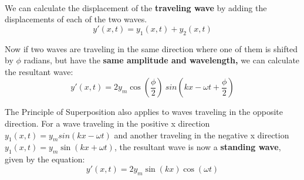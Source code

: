 \documentclass[11pt]{article}
\begin{document}
\hfill
\begin{minipage}[b]{0.3\textwidth}
\end{minipage}

    \noindent \\ We can calculate the displacement of the \textbf{traveling wave} by adding the displacements of each of the two waves.
    \begin{equation}
        y'(x,t) = y_1(x,t) + y_2(x,t) \tag{displacement of waves}
        \end{equation}

    \noindent Now if two waves are traveling in the same direction where one of them is shifted by $\phi$ radians,
    but have the \textbf{same amplitude and wavelength,} we can calculate the resultant wave:
    \begin{equation}
        y'(x,t) = 2y_{m}\cos(\frac{\phi}{2})\    sin(kx - \omega t + \frac{\phi}{2}) \tag{traveling wave}
    \end{equation}

    \noindent The Principle of Superposition also applies to waves traveling in the opposite direction.
    For a wave traveling in the positive x direction $y_1(x,t) = y_msin(kx - \omega t)$ and another traveling
    in the negative x direction $y_1(x,t) = y_m\sin(kx + \omega t)$, the resultant wave is now a
    \textbf{standing wave}, given by the equation:
    \begin{equation}
        y'(x,t) = 2y_{m}\sin(kx)\cos(\omega t) \tag{standing wave}
    \end{equation}
\end{document}
